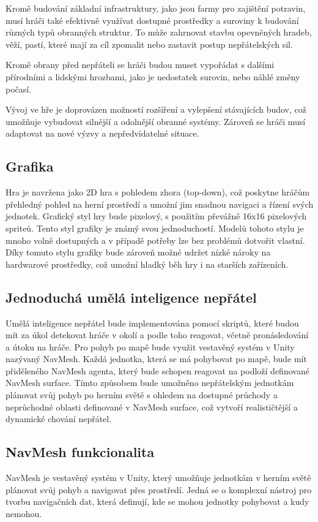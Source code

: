 Kromě budování základní infrastruktury, jako jsou farmy pro zajištění potravin, musí hráči také efektivně využívat dostupné prostředky a suroviny k budování různých typů obranných struktur. To může zahrnovat stavbu opevněných hradeb, věží, pastí, které mají za cíl zpomalit nebo zastavit postup nepřátelských sil.

Kromě obrany před nepřáteli se hráči budou muset vypořádat s dalšími přírodními a lidskými hrozbami, jako je nedostatek surovin, nebo náhlé změny počasí.

Vývoj ve hře je doprovázen možností rozšíření a vylepšení stávajících budov, což umožňuje vybudovat silnější a odolnější obranné systémy. Zároveň se hráči musí adaptovat na nové výzvy a nepředvídatelné situace.

\subsection{Grafika}
Hra je navržena jako 2D hra s pohledem zhora (top-down), což poskytne hráčům přehledný pohled na herní prostředí a umožní jim snadnou navigaci a řízení svých jednotek. Grafický styl hry bude pixelový, s použitím převážně 16x16 pixelových spriteů. Tento styl grafiky je známý svou jednoduchostí. Modelů tohoto stylu je mnoho volně dostupných a v případě potřeby lze bez problémů dotvořit vlastní. Díky tomuto stylu grafiky bude zároveň možné udržet nízké nároky na hardwarové prostředky, což umožní hladký běh hry i na starších zařízeních.

\subsection{Jednoduchá umělá inteligence nepřátel}
Umělá inteligence nepřátel bude implementována pomocí skriptů, které budou mít za úkol detekovat hráče v okolí a podle toho reagovat, včetně pronásledování a útoku na hráče. Pro pohyb po mapě bude využit vestavěný systém v Unity nazývaný NavMesh. Každá jednotka, která se má pohybovat po mapě, bude mít přiděleného NavMesh agenta, který bude schopen reagovat na podloží definované NavMesh surface. Tímto způsobem bude umožněno nepřátelským jednotkám plánovat svůj pohyb po herním světě s ohledem na dostupné průchody a neprůchodné oblasti definované v NavMesh surface, což vytvoří realističtější a dynamické chování nepřátel.

\subsection{NavMesh funkcionalita}
NavMesh je vestavěný systém v Unity, který umožňuje jednotkám v herním světě plánovat svůj pohyb a navigovat přes prostředí. Jedná se o komplexní nástroj pro tvorbu navigačních dat, která definují, kde se mohou jednotky pohybovat a kudy nemohou.

